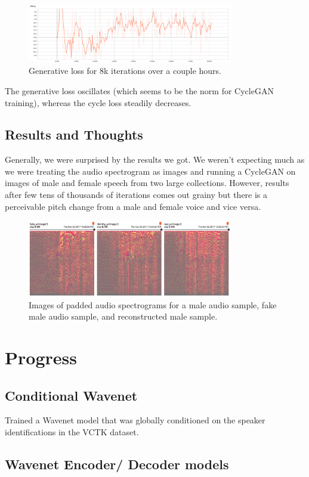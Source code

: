 \documentclass[a4paper]{article}
\begin{document}
\begin{figure}[!htb]
\centering
\includegraphics[width=0.8\textwidth]{cyclegan_genloss.png}
\caption{\label{fig:genloss}Generative loss for 8k iterations over a couple hours.}
\end{figure}

The generative loss oscillates (which seems to be the norm for CycleGAN training), whereas the cycle loss steadily decreases.

\subsection{Results and Thoughts}
Generally, we were surprised by the results we got. We weren't expecting much as we were treating the audio spectrogram as images and running a CycleGAN on images of male and female speech from two large collections. However, results after few tens of thousands of iterations comes out grainy but there is a perceivable pitch change from a male and female voice and vice versa.

\begin{figure}[!htb]
\centering
\includegraphics[width=0.8\textwidth]{a_prog_8k.png}
\caption{\label{fig:cycle_comparison}Images of padded audio spectrograms for a male audio sample, fake male audio sample, and reconstructed male sample.}
\end{figure}


\section{Progress}
\subsection{Conditional Wavenet}
Trained a Wavenet model that was globally conditioned on the speaker identifications in the VCTK dataset.
\subsection{Wavenet Encoder/ Decoder models}
\end{document}
